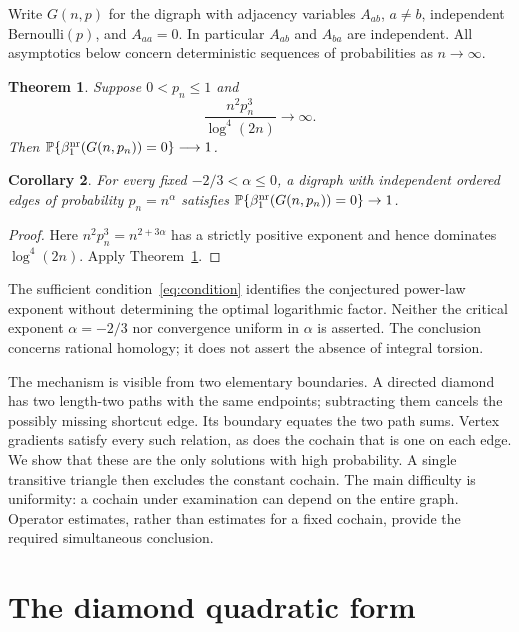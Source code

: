 \documentclass[11pt]{article}
\newtheorem{theorem}{Theorem}[section]
\newtheorem{corollary}[theorem]{Corollary}
\theoremstyle{remark}
\newcommand{\Prob}{\mathbb P}
\begin{document}
Write $G(n,p)$ for the digraph with adjacency variables $A_{ab}$,
$a\ne b$, independent Bernoulli$(p)$, and $A_{aa}=0$. In particular
$A_{ab}$ and $A_{ba}$ are independent. All asymptotics below concern
deterministic sequences of probabilities as $n\to\infty$.

\begin{theorem}\label{thm:main}
Suppose $0<p_n\leq1$ and
\begin{equation}\label{eq:condition}
 \frac{n^2p_n^3}{\log^4(2n)}\longrightarrow\infty.
\end{equation}
Then
$\Prob\{\beta_1^{\rm nr}(G(n,p_n))=0\}\longrightarrow1$.
\end{theorem}

\begin{corollary}\label{cor:power}
For every fixed $-2/3<\alpha\leq0$, a digraph with independent ordered
edges of probability $p_n=n^\alpha$ satisfies
$\Prob\{\beta_1^{\rm nr}(G(n,p_n))=0\}\to1$.
\end{corollary}
\begin{proof}
Here $n^2p_n^3=n^{2+3\alpha}$ has a strictly positive exponent and hence
dominates $\log^4(2n)$. Apply Theorem~\ref{thm:main}.
\end{proof}

The sufficient condition~\eqref{eq:condition} identifies the conjectured
power-law exponent without determining the optimal logarithmic factor.
Neither the critical exponent $\alpha=-2/3$ nor convergence uniform in
$\alpha$ is asserted. The conclusion concerns rational homology; it does
not assert the absence of integral torsion.

The mechanism is visible from two elementary boundaries. A directed diamond
has two length-two paths with the same endpoints; subtracting them cancels
the possibly missing shortcut edge. Its boundary equates the two path sums.
Vertex gradients satisfy every such relation, as does the cochain that is
one on each edge. We show that these are the only solutions with high
probability. A single transitive triangle then excludes the constant cochain.
The main difficulty is uniformity: a cochain under examination can depend
on the entire graph. Operator estimates, rather than estimates for a fixed
cochain, provide the required simultaneous conclusion.

\section{The diamond quadratic form}
\end{document}
